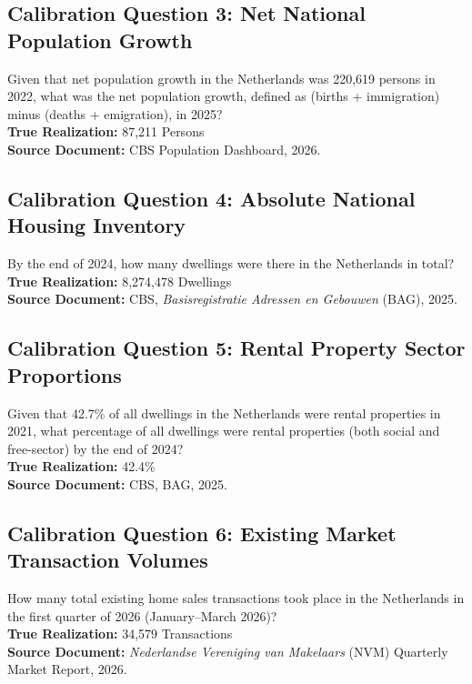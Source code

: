 \subsection*{Calibration Question 3: Net National Population Growth}
Given that net population growth in the Netherlands was 220,619 persons in 2022, what was the net population growth, defined as (births + immigration) minus (deaths + emigration), in 2025?\\\newline
\textbf{True Realization:} 87,211 Persons\\\newline
\textbf{Source Document:} CBS Population Dashboard, 2026.

\subsection*{Calibration Question 4: Absolute National Housing Inventory}
By the end of 2024, how many dwellings were there in the Netherlands in total?\\\newline
\textbf{True Realization:} 8,274,478 Dwellings\\\newline
\textbf{Source Document:} CBS, \textit{Basisregistratie Adressen en Gebouwen} (BAG), 2025.

\subsection*{Calibration Question 5: Rental Property Sector Proportions}
Given that 42.7\% of all dwellings in the Netherlands were rental properties in 2021, what percentage of all dwellings were rental properties (both social and free-sector) by the end of 2024?\\\newline
\textbf{True Realization:} 42.4\%\\\newline
\textbf{Source Document:} CBS, BAG, 2025.

\subsection*{Calibration Question 6: Existing Market Transaction Volumes}
How many total existing home sales transactions took place in the Netherlands in the first quarter of 2026 (January–March 2026)?\\\newline
\textbf{True Realization:} 34,579 Transactions\\\newline
\textbf{Source Document:} \textit{Nederlandse Vereniging van Makelaars} (NVM) Quarterly Market Report, 2026.

